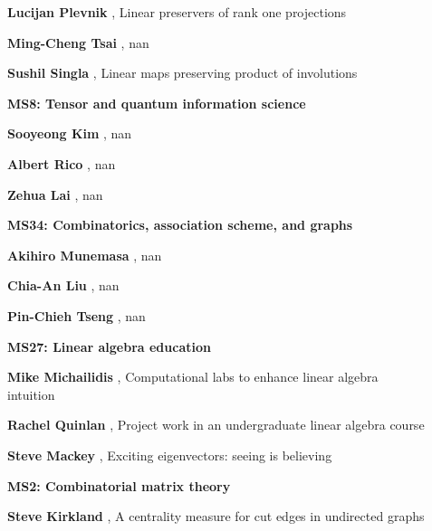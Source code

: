 \documentclass[ILAS2025-program.tex]{subfiles}
\begin{document}
\begin{description}
\begin{description}
    \item[] \textbf{Lucijan Plevnik} , Linear preservers of rank one projections
        \item[] \textbf{Ming-Cheng Tsai} , nan
        \item[] \textbf{Sushil Singla} , Linear maps preserving product of involutions
        \end{description}
    \begin{description}
    \item[] {\color{mstitle}\textbf{MS8: Tensor and quantum information science}} 
    \item[] \textbf{Sooyeong Kim} , nan
        \item[] \textbf{Albert Rico} , nan
        \item[] \textbf{Zehua Lai} , nan
        \end{description}
    \begin{description}
    \item[] {\color{mstitle}\textbf{MS34: Combinatorics, association scheme, and graphs}} 
    \item[] \textbf{Akihiro Munemasa} , nan
        \item[] \textbf{Chia-An Liu} , nan
        \item[] \textbf{Pin-Chieh Tseng} , nan
        \end{description}
    \begin{description}
    \item[] {\color{mstitle}\textbf{MS27: Linear algebra education}} 
    \item[] \textbf{Mike Michailidis} , Computational labs to enhance linear algebra intuition
        \item[] \textbf{Rachel Quinlan} , Project work in an undergraduate linear algebra course
        \item[] \textbf{Steve Mackey} , Exciting eigenvectors: seeing is believing
        \end{description}
    \begin{description}
    \item[] {\color{mstitle}\textbf{MS2: Combinatorial matrix theory}} 
    \item[] \textbf{Steve Kirkland} , A centrality measure for cut edges in undirected graphs


\end{description}
\end{description}
\end{document}
